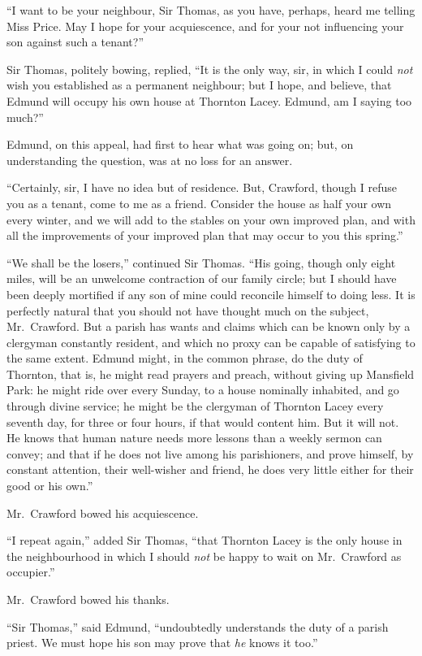``I want to be your neighbour, Sir Thomas, as you have,
perhaps, heard me telling Miss Price.  May I hope
for your acquiescence, and for your not influencing
your son against such a tenant?''

Sir Thomas, politely bowing, replied, ``It is the only way,
sir, in which I could \emph{not} wish you established as a
permanent neighbour; but I hope, and believe, that Edmund will
occupy his own house at Thornton Lacey.  Edmund, am I saying too
much?''

Edmund, on this appeal, had first to hear what was going on;
but, on understanding the question, was at no loss for an answer.

``Certainly, sir, I have no idea but of residence.
But, Crawford, though I refuse you as a tenant,
come to me as a friend.  Consider the house as half
your own every winter, and we will add to the stables
on your own improved plan, and with all the improvements
of your improved plan that may occur to you this spring.''

``We shall be the losers,'' continued Sir Thomas.
``His going, though only eight miles, will be an unwelcome
contraction of our family circle; but I should have been
deeply mortified if any son of mine could reconcile
himself to doing less.  It is perfectly natural that you
should not have thought much on the subject, Mr.\ Crawford.
But a parish has wants and claims which can be known
only by a clergyman constantly resident, and which no
proxy can be capable of satisfying to the same extent.
Edmund might, in the common phrase, do the duty of Thornton,
that is, he might read prayers and preach, without giving
up Mansfield Park:  he might ride over every Sunday, to a
house nominally inhabited, and go through divine service;
he might be the clergyman of Thornton Lacey every seventh day,
for three or four hours, if that would content him.
But it will not.  He knows that human nature needs more
lessons than a weekly sermon can convey; and that if he
does not live among his parishioners, and prove himself,
by constant attention, their well-wisher and friend, he does
very little either for their good or his own.''

Mr.\ Crawford bowed his acquiescence.

``I repeat again,'' added Sir Thomas, ``that Thornton Lacey
is the only house in the neighbourhood in which I should
\emph{not} be happy to wait on Mr.\ Crawford as occupier.''

Mr.\ Crawford bowed his thanks.

``Sir Thomas,'' said Edmund, ``undoubtedly understands
the duty of a parish priest.  We must hope his son
may prove that \emph{he} knows it too.''

